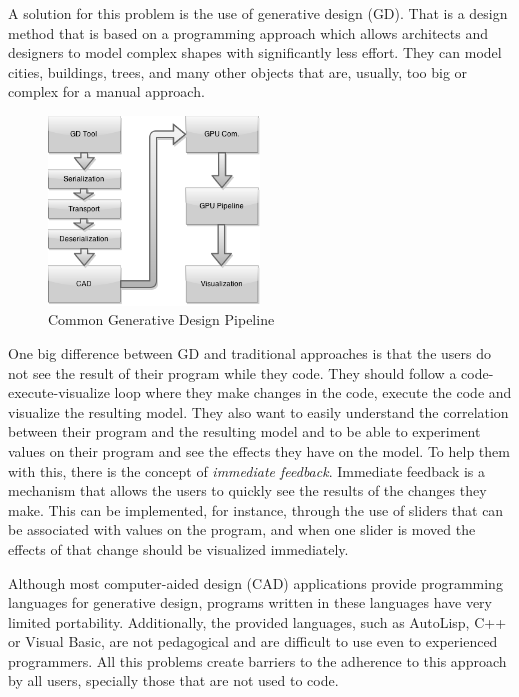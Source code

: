 A solution for this problem is the use of generative design (GD). That is a design method that is based on a programming approach which allows architects and designers to model complex shapes with significantly less effort. They can model cities, buildings, trees, and many other objects that are, usually, too big or complex for a manual approach.


\begin{figure}
    \centering
	\includegraphics[width=0.5\textwidth]{img/Architecture/GD-Common-Pipeline.png}
	\caption{Common Generative Design Pipeline}
	\label{fig:GD_Pipeline}
	\vspace{-15pt}
\end{figure}

One big difference between GD and traditional approaches is that the users do not see the result of their program while they code. They should follow a code-execute-visualize loop where they make changes in the code, execute the code and visualize the resulting model. They also want to easily understand the correlation between their program and the resulting model and to be able to experiment values on their program and see the effects they have on the model. To help them with this, there is the concept of \emph{immediate feedback}. Immediate feedback is a mechanism that allows the users to quickly see the results of the changes they make. This can be implemented, for instance, through the use of sliders that can be associated with values on the program, and when one slider is moved the effects of that change should be visualized immediately. 

Although most computer-aided design (CAD) applications provide programming languages for generative design, programs written in these languages have very limited portability. Additionally, the provided languages, such as AutoLisp, C++ or Visual Basic, are not pedagogical and are difficult to use even to experienced programmers. All this problems create barriers to the adherence to this approach by all users, specially those that are not used to code.\cite{ramos_et_al:OASIcs:2014:4565}

